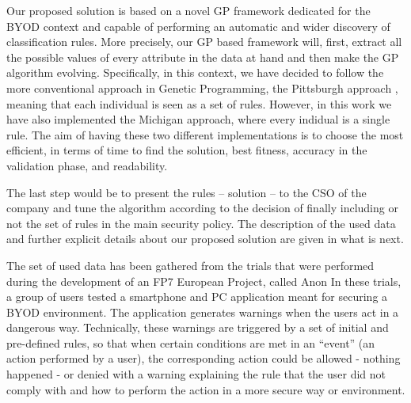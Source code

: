 \documentclass[runningheads]{llncs}
\begin{document}
Our proposed solution is based on a novel GP framework dedicated for
the BYOD context and capable of performing an automatic and wider discovery of classification rules. More precisely, our GP based framework will, first, extract all the possible values of every attribute in the data at hand and then make the GP algorithm evolving. 
Specifically, in this context, we have decided to follow the more
conventional approach in Genetic Programming, the Pittsburgh approach
\cite{freitas2002data}, meaning that each individual is seen as a set
of rules. However, in this work we have also implemented the Michigan
approach, where every indidual is a single rule. The aim of having these two different implementations is to choose the most efficient, in terms of time to find the solution, best fitness, accuracy in the validation phase, and readability.

The last step would be to present the rules -- solution -- to the CSO of the company and tune the algorithm according to the decision of
finally including or not the set of rules in the main security
policy. The description of the used data and further explicit details
about our proposed solution are given in what is next.

\label{subsec:data}

 The set of used data has been gathered from the trials that were performed
during the development of an FP7 European Project, called Anon
In these trials, a group of
 users tested a smartphone and PC application meant for securing a
 BYOD environment. The application generates warnings when the users
 act in a dangerous way. Technically, these warnings are triggered by
 a set of initial and pre-defined rules, so that when certain
 conditions are met in an ``event'' (an action performed by a user),
 the corresponding action could be allowed - nothing happened - or
 denied with a warning explaining the rule that the user did not comply with and how to perform the action in a more secure way or environment.
\end{document}
